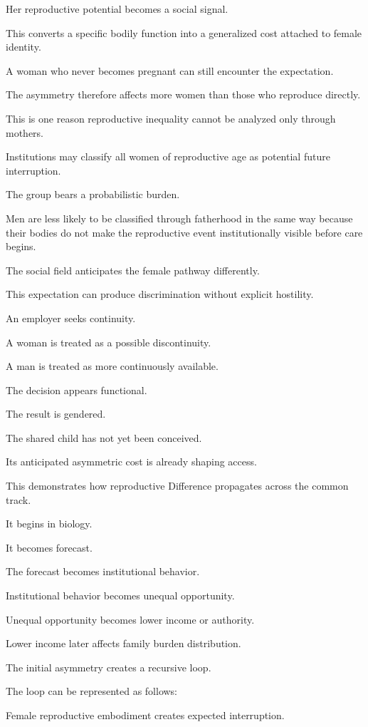 Her reproductive potential becomes a social signal.

This converts a specific bodily function into a generalized cost attached to female identity.

A woman who never becomes pregnant can still encounter the expectation.

The asymmetry therefore affects more women than those who reproduce directly.

This is one reason reproductive inequality cannot be analyzed only through mothers.

Institutions may classify all women of reproductive age as potential future interruption.

The group bears a probabilistic burden.

Men are less likely to be classified through fatherhood in the same way because their bodies do not make the reproductive event institutionally visible before care begins.

The social field anticipates the female pathway differently.

This expectation can produce discrimination without explicit hostility.

An employer seeks continuity.

A woman is treated as a possible discontinuity.

A man is treated as more continuously available.

The decision appears functional.

The result is gendered.

The shared child has not yet been conceived.

Its anticipated asymmetric cost is already shaping access.

This demonstrates how reproductive Difference propagates across the common track.

It begins in biology.

It becomes forecast.

The forecast becomes institutional behavior.

Institutional behavior becomes unequal opportunity.

Unequal opportunity becomes lower income or authority.

Lower income later affects family burden distribution.

The initial asymmetry creates a recursive loop.

The loop can be represented as follows:

Female reproductive embodiment creates expected interruption.

